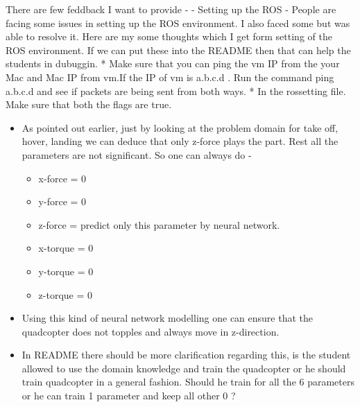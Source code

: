 \documentclass[11pt]{article}
\providecommand{\tightlist}{%
      \setlength{\itemsep}{0pt}\setlength{\parskip}{0pt}}
\begin{document}
There are few feddback I want to provide - - Setting up the ROS - People
are facing some issues in setting up the ROS environment. I also faced
some but was able to resolve it. Here are my some thoughts which I get
form setting of the ROS environment. If we can put these into the README
then that can help the students in dubuggin. * Make sure that you can
ping the vm IP from the your Mac and Mac IP from vm.If the IP of vm is
a.b.c.d . Run the command ping a.b.c.d and see if packets are being sent
from both ways. * In the rossetting file. Make sure that both the flags
are true.

\begin{itemize}
\tightlist
\item
  As pointed out earlier, just by looking at the problem domain for take
  off, hover, landing we can deduce that only z-force plays the part.
  Rest all the parameters are not significant. So one can always do -

  \begin{itemize}
  \tightlist
  \item
    x-force = 0
  \item
    y-force = 0
  \item
    z-force = predict only this parameter by neural network.
  \item
    x-torque = 0
  \item
    y-torque = 0
  \item
    z-torque = 0
  \end{itemize}
\item
  Using this kind of neural network modelling one can ensure that the
  quadcopter does not topples and always move in z-direction.
\item
  In README there should be more clarification regarding this, is the
  student allowed to use the domain knowledge and train the quadcopter
  or he should train quadcopter in a general fashion. Should he train
  for all the 6 parameters or he can train 1 parameter and keep all
  other 0 ?
\end{itemize}


    
    
    
    
\end{document}
